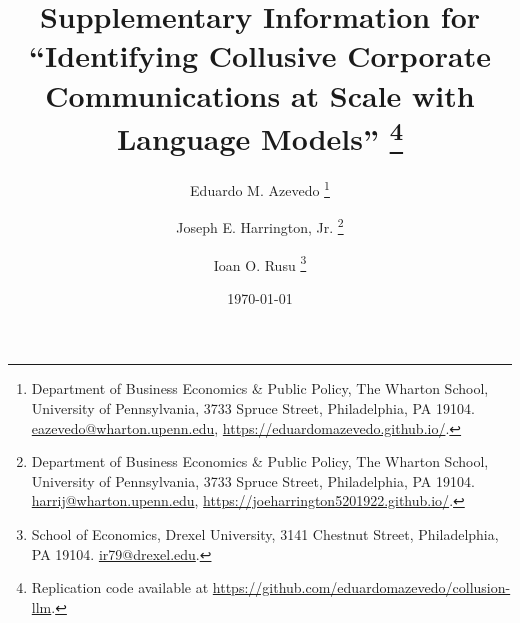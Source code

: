 \documentclass[12pt]{article}
\begin{document}
\title{Supplementary Information for ``Identifying Collusive Corporate Communications at Scale with Language Models''%
\thanks{Replication code available at \url{https://github.com/eduardomazevedo/collusion-llm}.}
}

\author{Eduardo M. Azevedo%
\thanks{Department of Business Economics \& Public Policy, The Wharton School, University of Pennsylvania, 3733 Spruce Street, Philadelphia, PA 19104. \href{mailto:eazevedo@wharton.upenn.edu}{eazevedo@wharton.upenn.edu}, \url{https://eduardomazevedo.github.io/}.}
\and Joseph E. Harrington, Jr.%
\thanks{Department of Business Economics \& Public Policy, The Wharton School, University of Pennsylvania, 3733 Spruce Street, Philadelphia, PA 19104. \href{mailto:harrij@wharton.upenn.edu}{harrij@wharton.upenn.edu}, \url{https://joeharrington5201922.github.io/}.}
\and Ioan O. Rusu%
\thanks{School of Economics, Drexel University, 3141 Chestnut Street, Philadelphia, PA 19104. \href{mailto:ir79@drexel.edu}{ir79@drexel.edu}.}
}

\date{\today}

\maketitle
\renewcommand{\thesection}{\Alph{section}}








\end{document}
